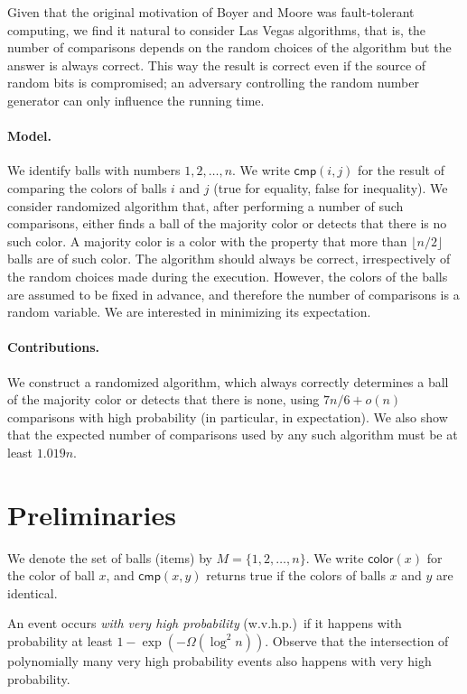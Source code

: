\documentclass{article}[11pt,a4paper]
\newcommand{\ballcolor}{\mathsf{color}}
\newcommand{\cmp}{\mathsf{cmp}}
\begin{document}
Given that the original motivation of Boyer and Moore was fault-tolerant computing,
we find it natural to consider Las Vegas algorithms,
that is, the number of comparisons depends on the random choices of the algorithm
but the answer is always correct. This way the result is correct even if the source of random
bits is compromised; an adversary controlling the random number generator can only
influence the running time.

\paragraph{Model.} We identify balls with numbers $1,2,\ldots,n$. We write $\cmp(i,j)$ for
the result of comparing the colors of balls $i$ and $j$ (true for equality, false for inequality). We consider randomized
algorithm that, after performing a number of such comparisons, either finds a ball
of the majority color or detects that there is no such color. A majority color is a color 
with the property that more than $\lfloor n/2\rfloor$ balls are of such color. The algorithm
should always be correct, irrespectively of the random choices made during the execution.
However, the colors of the balls are assumed to be fixed in advance, and therefore
the number of comparisons is a random variable. We are interested in minimizing
its expectation.

\paragraph{Contributions.} We construct a randomized algorithm, which always correctly
determines a ball of the majority color or detects that there is none, using $7n/6+o(n)$
comparisons with high probability (in particular, in expectation). We also show that
the expected number of comparisons used by any such algorithm must be at least
$1.019n$.

\section{Preliminaries}

We denote the set of balls (items) by $M = \{1,2,\ldots,n\}$. We write $\ballcolor(x)$ for the color of
ball $x$, and $\cmp(x,y)$ returns true if the colors of balls $x$ and $y$ are identical.

An event occurs \emph{with very high probability} (w.v.h.p.)\ if it happens with probability at least
$1 - \exp(-\Omega(\log^2 n))$. Observe that the intersection of polynomially many very high
probability events also happens with very high probability. 
\end{document}
